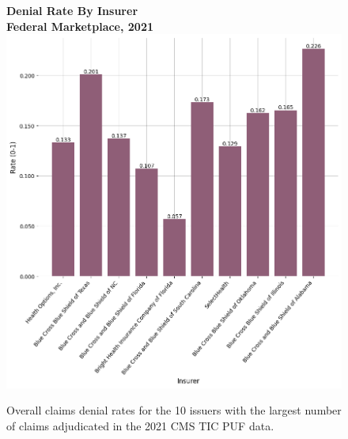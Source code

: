 \documentclass[12pt, a4paper,twoside,parskip=full]{report}
\theoremstyle{plain} %
\theoremstyle{definition} %
\theoremstyle{remark} %
\numberwithin{equation}{chapter}
\begin{document}
	
		\begin{figure}[h!]
			\centering
			\textbf{Denial Rate By Insurer}\\
			\textbf{Federal Marketplace, 2021}\\
			\includegraphics[width=\columnwidth]{images/cms_puf/denial_rate_by_insurer.png}
			\caption{Overall claims denial rates for the 10 issuers with the largest number of claims adjudicated in the 2021 CMS TIC PUF data.}
			\label{fedinsurerdenialrates}
		\end{figure}
	
		\clearpage
		
\end{document}
